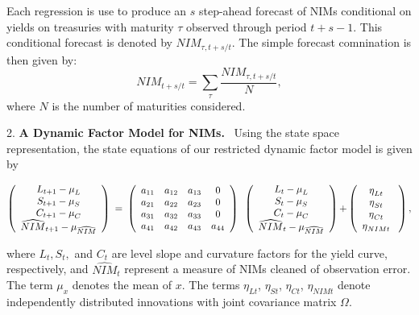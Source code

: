\documentclass[12pt]{article}
\begin{document}
Each regression is use to produce an $s$ step-ahead forecast of NIMs
conditional on yields on treasuries with maturity $\tau $ observed through
period $t+s-1.$ This conditional forecast is denoted by $NIM_{\tau ,t+s/t}.$%
The simple forecast comnination is then given by:%
\begin{equation*}
NIM_{t+s/t}=\sum_{\tau }\frac{NIM_{\tau ,t+s/t}}{N},
\end{equation*}%
where $N$ is the number of maturities considered.

2. \textbf{A Dynamic Factor Model for NIMs.} \ Using the state space
representation, the state equations of our restricted dynamic factor model
is given by

\begin{equation*}
\left(
\begin{array}{c}
{L_{t+1}-\mu _{L}} \\
{S_{t+1}-\mu _{S}} \\
{C_{t+1}-\mu _{C}} \\
\widehat{NIM}_{t+1}-\mu _{\widehat{NIM}}%
\end{array}%
\right) {\normalsize \ =\ }\left(
\begin{array}{cccc}
a_{11} & a_{12} & a_{13} & 0 \\
a_{21} & a_{22} & a_{23} & 0 \\
a_{31} & a_{32} & a_{33} & 0 \\
a_{41} & a_{42} & a_{43} & a_{44}%
\end{array}%
\right) {\normalsize \ }\left(
\begin{array}{c}
{L_{t}-\mu _{L}} \\
{S_{t}-\mu _{S}} \\
{C_{t}-\mu _{C}} \\
\widehat{NIM}_{t}-\mu _{\widehat{NIM}}%
\end{array}%
\right) {\normalsize +}\left(
\begin{array}{c}
{\eta _{Lt}} \\
{\eta _{St}} \\
{\eta _{Ct}} \\
{\eta _{NIMt}}%
\end{array}%
{\normalsize \ }\right) ,
\end{equation*}

where $L_{t},S_{t},$ and $C_{t}$ are level slope and curvature factors for
the yield curve, respectively, and $\widehat{NIM}_{t}$ represent a measure
of NIMs cleaned of observation error. The term $\mu _{x}$ denotes the mean
of $x$. The terms ${\eta _{Lt}}$, ${\eta _{St}}$, ${\eta _{Ct}}$, ${\eta
_{NIMt}}$ denote independently distributed innovations with joint covariance
matrix $\Omega $.
\end{document}
